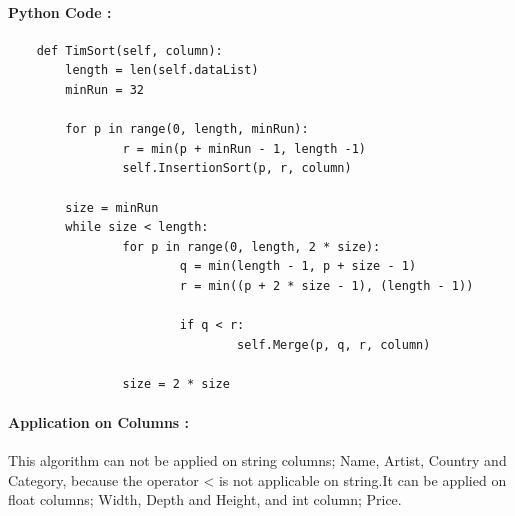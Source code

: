 \documentclass[12pt]{article}
\begin{document}
    \paragraph{Python Code :}
    \begin{verbatim}
    def TimSort(self, column):
        length = len(self.dataList)
        minRun = 32

        for p in range(0, length, minRun):
                r = min(p + minRun - 1, length -1)
                self.InsertionSort(p, r, column)

        size = minRun
        while size < length:
                for p in range(0, length, 2 * size):
                        q = min(length - 1, p + size - 1)
                        r = min((p + 2 * size - 1), (length - 1))

                        if q < r:
                                self.Merge(p, q, r, column)        

                size = 2 * size
    \end{verbatim}
    \paragraph{Application on Columns :} 
    This algorithm can not be applied on string columns; Name, Artist, Country and Category, because the operator < is not applicable on string.It can be applied on float columns; Width, Depth and Height, and int column; Price.
    
    \newpage
\end{document}
